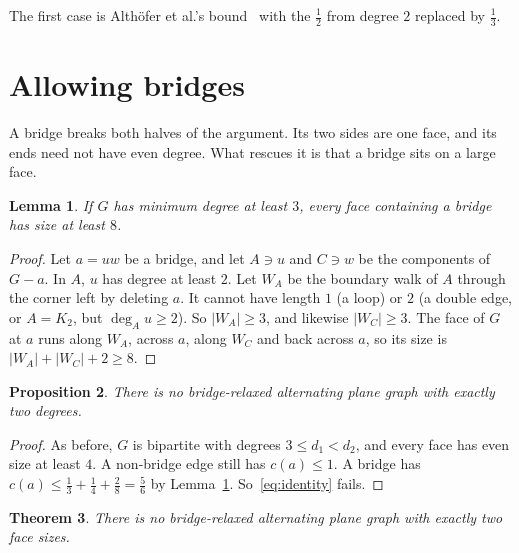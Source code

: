 \documentclass{amsart}
\theoremstyle{plain}
\newtheorem{theorem}{Theorem}[section]
\newtheorem{lemma}[theorem]{Lemma}
\newtheorem{proposition}[theorem]{Proposition}
\theoremstyle{definition}
\theoremstyle{remark}
\begin{document}
The first case is Alth\"ofer et al.'s bound~\cite[(9.9)]{AHSSV2015} with the
$\frac12$ from degree $2$ replaced by $\frac13$.

\section{Allowing bridges}\label{sec:c2}

A bridge breaks both halves of the argument. Its two sides are one face, and its
ends need not have even degree. What rescues it is that a bridge sits on a large
face.

\begin{lemma}\label{lem:bridgeface}
If $G$ has minimum degree at least $3$, every face containing a bridge has size
at least $8$.
\end{lemma}

\begin{proof}
Let $a=uw$ be a bridge, and let $A \ni u$ and $C \ni w$ be the components of
$G-a$. In $A$, $u$ has degree at least $2$. Let $W_A$ be the boundary walk of $A$
through the corner left by deleting $a$. It cannot have length $1$ (a loop) or
$2$ (a double edge, or $A=K_2$, but $\deg_A u \ge 2$). So
$|W_A| \ge 3$, and likewise $|W_C| \ge 3$. The face of $G$ at $a$ runs along
$W_A$, across $a$, along $W_C$ and back across $a$, so its size is
$|W_A|+|W_C|+2 \ge 8$.
\end{proof}

\begin{proposition}\label{prop:twoY-weak}
There is no bridge-relaxed alternating plane graph with exactly two degrees.
\end{proposition}

\begin{proof}
As before, $G$ is bipartite with degrees $3 \le d_1 < d_2$, and every face has
even size at least $4$. A non-bridge edge still has $c(a) \le 1$. A bridge has
$c(a) \le \frac13+\frac14+\frac28 = \frac56$ by Lemma~\ref{lem:bridgeface}.
So~\eqref{eq:identity} fails.
\end{proof}

\begin{theorem}\label{thm:x2weak}
There is no bridge-relaxed alternating plane graph with exactly two face sizes.
\end{theorem}
\end{document}
